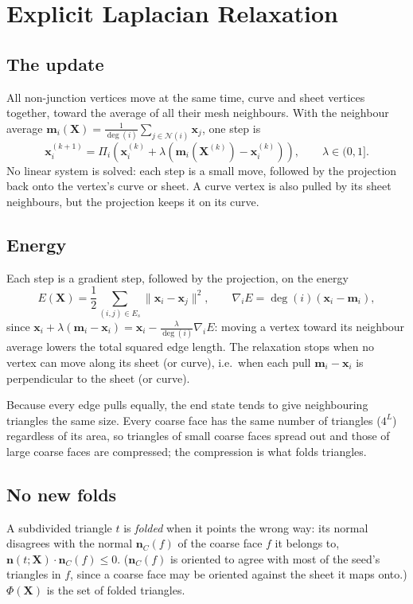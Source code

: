\documentclass[11pt,a4paper]{article}
\newcommand{\Proj}{\Pi}
\newcommand{\x}{\mathbf{x}}
\newcommand{\X}{\mathbf{X}}
\newcommand{\m}{\mathbf{m}}
\newcommand{\n}{\mathbf{n}}
\begin{document}
\section{Explicit Laplacian Relaxation}

\subsection{The update}
All non-junction vertices move at the same time, curve and sheet vertices together, toward the average of all their mesh neighbours. With the neighbour average $\m_i(\X) = \frac{1}{\deg(i)} \sum_{j \in \mathcal{N}(i)} \x_j$, one step is
\begin{equation}
\label{eq:step}
    \x_i^{(k+1)} = \Proj_i\!\left( \x_i^{(k)} + \lambda \left( \m_i(\X^{(k)}) - \x_i^{(k)} \right) \right), \qquad \lambda \in (0, 1].
\end{equation}
No linear system is solved: each step is a small move, followed by the projection back onto the vertex's curve or sheet. A curve vertex is also pulled by its sheet neighbours, but the projection keeps it on its curve.

\subsection{Energy}
Each step is a gradient step, followed by the projection, on the energy
\begin{equation}
    E(\X) = \frac{1}{2} \sum_{(i,j) \in E_s} \|\x_i - \x_j\|^2, \qquad \nabla_i E = \deg(i) \left( \x_i - \m_i \right),
\end{equation}
since $\x_i + \lambda(\m_i - \x_i) = \x_i - \frac{\lambda}{\deg(i)} \nabla_i E$: moving a vertex toward its neighbour average lowers the total squared edge length. The relaxation stops when no vertex can move along its sheet (or curve), i.e.\ when each pull $\m_i - \x_i$ is perpendicular to the sheet (or curve).

Because every edge pulls equally, the end state tends to give neighbouring triangles the same size. Every coarse face has the same number of triangles ($4^L$) regardless of its area, so triangles of small coarse faces spread out and those of large coarse faces are compressed; the compression is what folds triangles.

\subsection{No new folds}
A subdivided triangle $t$ is \emph{folded} when it points the wrong way: its normal disagrees with the normal $\n_C(f)$ of the coarse face $f$ it belongs to, $\n(t; \X) \cdot \n_C(f) \le 0$. ($\n_C(f)$ is oriented to agree with most of the seed's triangles in $f$, since a coarse face may be oriented against the sheet it maps onto.) $\Phi(\X)$ is the set of folded triangles.
\end{document}
